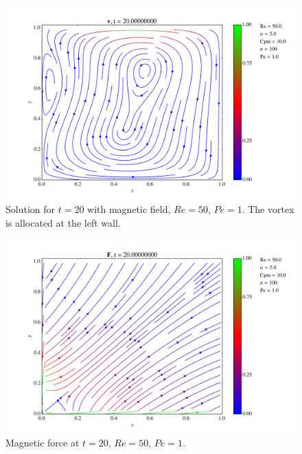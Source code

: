 \documentclass[journal]{IEEEtran}
\begin{document}
\begin{figure}[!t]
\centering
\includegraphics[width=\linewidth]{figures/MagRe50Pe1/Re50Pe1_t20}
\caption{Solution for $t=20$ with magnetic field, $\mathit{Re}=50$, $\mathit{Pe}=1$. The vortex is allocated at the left wall. \label{Re050Pe1t20}}
\end{figure}

\begin{figure}[!t]
\centering
\includegraphics[width=\linewidth]{figures/MagRe50Pe1/F0500}
\caption{Magnetic force at $t=20$, $\mathit{Re}=50$, $\mathit{Pe}=1$. \label{FRe50Pe1}}
\end{figure}
\end{document}
